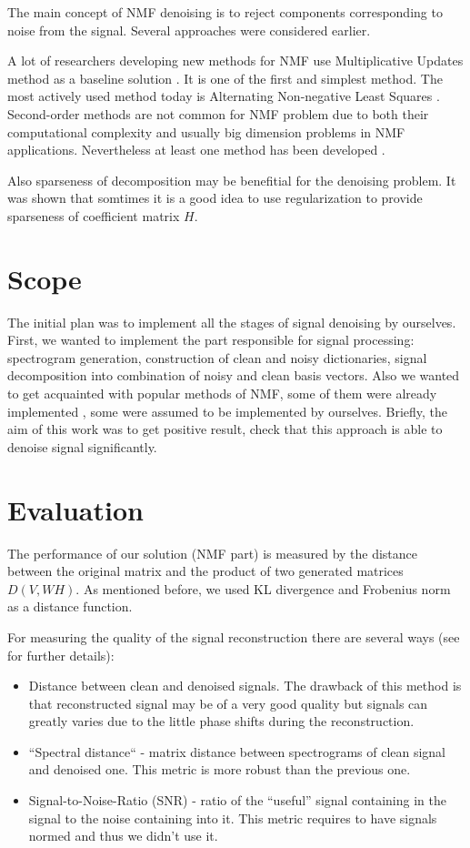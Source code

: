 \documentclass[11pt]{article}
\begin{document}
The main concept of NMF denoising is to reject components corresponding to noise from the signal. Several approaches were considered earlier.

A lot of researchers developing new methods for NMF use Multiplicative Updates method as a baseline solution \cite{riab}. It is one of the first and simplest method. The most actively used method today is Alternating Non-negative Least Squares \cite{riab}. Second-order methods are not common for NMF problem due to both their computational complexity and usually big dimension problems in NMF applications. Nevertheless at least one method has been developed \cite{zdunek}.

Also sparseness of decomposition may be benefitial for the denoising problem. It was shown that somtimes  it is a good idea to use regularization \cite{cauchi} to provide sparseness of coefficient matrix $H$.

\section{Scope}

The initial plan was to implement all the stages of signal denoising by ourselves. First, we wanted to implement the part responsible for signal processing: spectrogram generation, construction of clean and noisy dictionaries, signal decomposition into combination of noisy and clean basis vectors. Also we wanted to get acquainted with popular methods of NMF, some of them were already implemented \cite{nimfa}, some were assumed to be implemented by ourselves. Briefly, the aim of this work was to get positive result, check that this approach is able to denoise signal significantly.

\section{Evaluation}

The performance of our solution (NMF part) is measured by the distance between the original matrix and the product of two generated matrices $D(V, WH)$. As mentioned before, we used KL divergence and Frobenius norm as a distance function.

For measuring the quality of the signal reconstruction there are several ways (see \cite{hu} for further details):
\begin{itemize}
  \item Distance between clean and denoised signals. The drawback of this method is that reconstructed signal may be of a very good quality but signals can greatly varies due to the little phase shifts during the reconstruction.
  \item “Spectral distance“ - matrix distance between spectrograms of clean signal and denoised one. This metric is more robust than the previous one.
  \item Signal-to-Noise-Ratio (SNR) - ratio of the “useful” signal containing in the signal to the noise containing into it. This metric requires to have signals normed and thus we didn’t use it.
\end{itemize}
    
\end{document}
